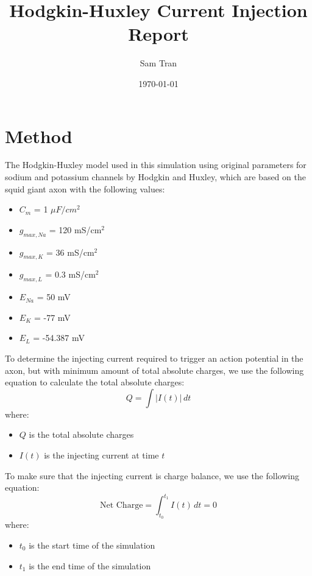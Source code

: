 \documentclass[letterpaper,12pt]{article}
\title{Hodgkin-Huxley Current Injection Report}
\author{Sam Tran}
\date{\today}
\begin{document}
\maketitle
\section*{Method}



\noindent The Hodgkin-Huxley model used in this simulation using original parameters for sodium and potassium channels by Hodgkin and Huxley, which are based on the squid giant axon with the following values:
\begin{multicols}{2}
    \begin{itemize}
        \item $C_m$ = 1 $\mu F/cm^2$
        \item $g_{max,Na}$ = 120 mS/cm$^2$
        \item $g_{max,K}$ = 36 mS/cm$^2$
        \item $g_{max,L}$ = 0.3 mS/cm$^2$
        \item $E_{Na}$ = 50 mV
        \item $E_{K}$ = -77 mV
        \item $E_{L}$ = -54.387 mV
    \end{itemize}  
\end{multicols}

\noindent To determine the injecting current required to trigger an action potential in the axon, but with minimum amount of total absolute charges, we use the following equation to calculate the total absolute charges:
\begin{equation}
    Q = \int |I(t)|\, dt
\end{equation}
where:
\begin{multicols}{2}
    \begin{itemize}
        \item $Q$ is the total absolute charges
        \item $I(t)$ is the injecting current at time $t$
    \end{itemize}
\end{multicols}
\noindent To make sure that the injecting current is charge balance, we use the following equation:
\begin{equation}
    \text{Net Charge} = \int_{t_0}^{t_1} I(t)\, dt = 0
\end{equation}
where:
\begin{multicols}{2}
    \begin{itemize}
        \item $t_0$ is the start time of the simulation
        \item $t_1$ is the end time of the simulation
    \end{itemize}
\end{multicols}
\end{document}
